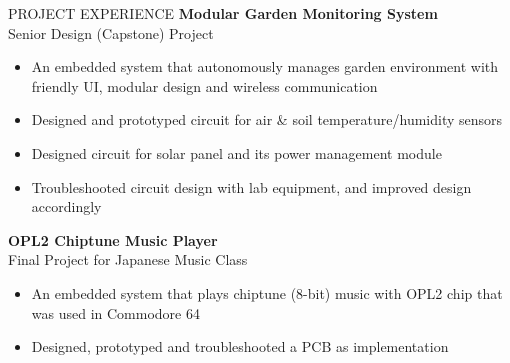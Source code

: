 \documentclass{../lib/resume} %
\begin{document}

    \begin{rSection}{PROJECT EXPERIENCE}
        \textbf{Modular Garden Monitoring System} \\
        Senior Design (Capstone) Project
        \begin{itemize}
            \itemsep -4pt {}
            \item An embedded system that autonomously manages garden environment with friendly UI, modular design and wireless communication
            \item Designed and prototyped circuit for air \& soil temperature/humidity sensors
            \item Designed circuit for solar panel and its power management module
            \item Troubleshooted circuit design with lab equipment, and improved design accordingly
        \end{itemize}

        \textbf{OPL2 Chiptune Music Player} \\
        Final Project for Japanese Music Class
        \begin{itemize}
            \itemsep -4pt {}
            \item An embedded system that plays chiptune (8-bit) music with OPL2 chip that was used in Commodore 64
            \item Designed, prototyped and troubleshooted a PCB as implementation
        \end{itemize}

    \end{rSection}

%
%
%
%
%
\end{document}
